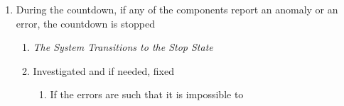 \documentclass[letterpaper]{article}
\begin{document}
\begin{enumerate}
      \begin{enumerate}
         \item The System continuously monitors the fueling.
         \item Fueling  and the countdown stops if any anomalies or
            errors are reported.
            \begin{enumerate}
               \item \textit{This transitions to the Stop State}
            \end{enumerate}
         \item  Fueling does not continue until the errors and
            anomalies are fixed
            \begin{enumerate}
               \item If the errors are severe enough to where it is
                  impossible to fix without aborting the launch, then
                  the Countdown is aborted
                  \begin{enumerate}
                     \item \textit{This transitions to the Abort
                        State}
                  \end{enumerate}
            \end{enumerate}
         \item Once the errors are fixed, Fueling is resumed and the
            countdown continues
            \begin{enumerate}
               \item \textit{Transitions to the Countdown State}
               \item \textit{Transitions to the Fueling Substate
                  within the Countdown State}
            \end{enumerate}
         \item \textit{System Transitions out of the Fueling Substate
            into the Fueled Substate once Stages are Fueled}
      \end{enumerate}
   \item During the countdown, if any of the components report an 
      anomaly or an error, the countdown is stopped
      \begin{enumerate}
         \item \textit{The System Transitions to the Stop State}
         \item Investigated and if needed, fixed
            \begin{enumerate}
               \item If the errors are such that it is impossible to 

\end{enumerate}
\end{enumerate}
\end{enumerate}
\end{document}
